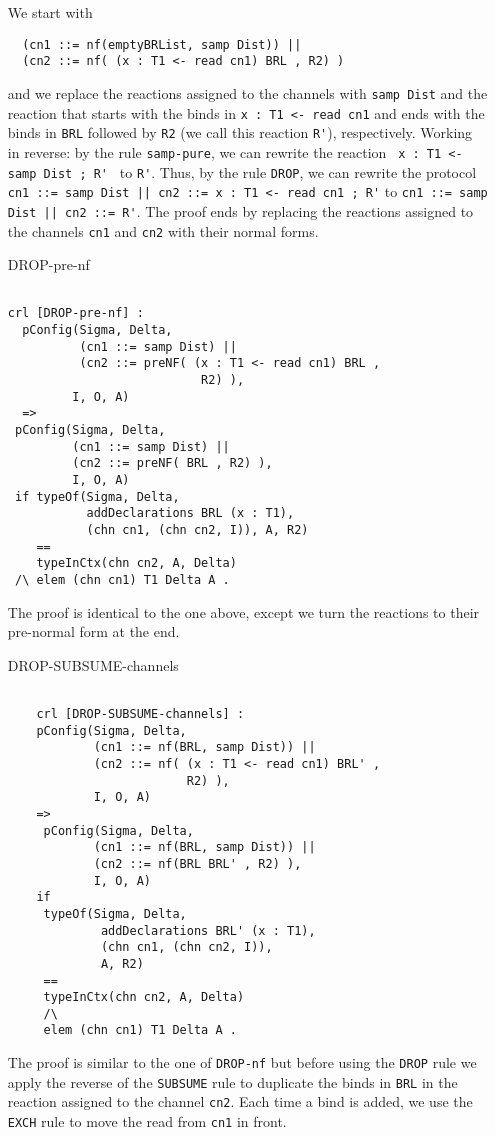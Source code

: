 \documentclass{article}
\begin{document}
\begin{itemize}
 We start with 
 \begin{lstlisting}
  (cn1 ::= nf(emptyBRList, samp Dist)) || 
  (cn2 ::= nf( (x : T1 <- read cn1) BRL , R2) )
 \end{lstlisting} 
 \noindent and we replace the reactions assigned to the 
 channels with \verb+samp Dist+ and the reaction that starts
 with the binds in \verb+x : T1 <- read cn1+ and ends with 
 the binds in \verb+BRL+ followed by \verb+R2+ (we call this reaction
 \verb+R'+), respectively.
 Working in reverse: by the rule \verb+samp-pure+,
 we can rewrite the reaction \verb+ x : T1 <- samp Dist ; R' +  
 to \verb+R'+. Thus, by the rule \verb+DROP+, we can rewrite the 
 protocol \verb+cn1 ::= samp Dist || cn2 ::= x : T1 <- read cn1 ; R'+
 to \verb+cn1 ::= samp Dist || cn2 ::= R'+. The proof ends by replacing
 the reactions assigned to the channels \verb+cn1+ and \verb+cn2+ with 
 their normal forms.
 
 
\item[DROP-pre-nf]
 \begin{lstlisting} 
                   
crl [DROP-pre-nf] :
  pConfig(Sigma, Delta,
          (cn1 ::= samp Dist) || 
          (cn2 ::= preNF( (x : T1 <- read cn1) BRL , 
                           R2) ),
         I, O, A) 
  =>           
 pConfig(Sigma, Delta,
         (cn1 ::= samp Dist) || 
         (cn2 ::= preNF( BRL , R2) ),
         I, O, A) 
 if typeOf(Sigma, Delta, 
           addDeclarations BRL (x : T1), 
           (chn cn1, (chn cn2, I)), A, R2) 
    == 
    typeInCtx(chn cn2, A, Delta)
 /\ elem (chn cn1) T1 Delta A .   
       \end{lstlisting}
       
 The proof is identical to the one above, except
 we turn the reactions to their pre-normal form at the end.      

\item[DROP-SUBSUME-channels]
 \begin{lstlisting} 
        
    crl [DROP-SUBSUME-channels] :
    pConfig(Sigma, Delta,
            (cn1 ::= nf(BRL, samp Dist)) || 
            (cn2 ::= nf( (x : T1 <- read cn1) BRL' , 
                         R2) ),
            I, O, A) 
    =>           
     pConfig(Sigma, Delta,
            (cn1 ::= nf(BRL, samp Dist)) || 
            (cn2 ::= nf(BRL BRL' , R2) ),
            I, O, A) 
    if 
     typeOf(Sigma, Delta, 
             addDeclarations BRL' (x : T1), 
             (chn cn1, (chn cn2, I)), 
             A, R2) 
     == 
     typeInCtx(chn cn2, A, Delta)
     /\
     elem (chn cn1) T1 Delta A .  
       \end{lstlisting}
 The proof is similar to the one of \verb+DROP-nf+ but before
 using the \verb+DROP+ rule we apply the reverse of the 
 \verb+SUBSUME+ rule to duplicate the binds in \verb+BRL+ in 
 the reaction assigned to the channel \verb+cn2+. Each time a bind
 is added, we use the \verb+EXCH+ rule to move the read from \verb+cn1+
 in front. 


\end{itemize}
\end{document}
